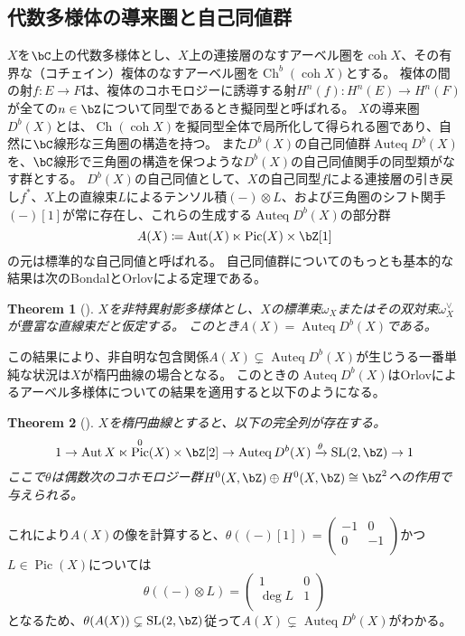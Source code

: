 \documentclass[uplatex,a4paper,dvipdfmx]{jsarticle}
\theoremstyle{plain}
\newtheorem{theorem}{Theorem}[section]
\theoremstyle{definition}
\DeclareMathOperator{\Auteq}{\mathrm{Auteq}}
\DeclareMathOperator{\Pic}{\mathrm{Pic}}
\DeclareMathOperator{\Aut}{\mathrm{Aut}}
\DeclareMathOperator{\SL}{\mathrm{SL}}
\DeclareMathOperator{\Ch}{\mathrm{Ch}}
\DeclareMathOperator{\coh}{\mathrm{coh}}
\begin{document}
\subsection{代数多様体の導来圏と自己同値群}
$X$を$\bC$上の代数多様体とし、$X$上の連接層のなすアーベル圏を$\coh X$、その有界な（コチェイン）複体のなすアーベル圏を$\Ch^b(\coh X)$とする。
複体の間の射$f \colon E \to F$は、複体のコホモロジーに誘導する射$H^n(f) \colon H^n(E) \to H^n(F)$が全ての$n \in \bZ$について同型であるとき擬同型と呼ばれる。
$X$の導来圏$D^b(X)$とは、$\Ch(\coh X)$を擬同型全体で局所化して得られる圏であり、自然に$\bC$線形な三角圏の構造を持つ。
また$D^b(X)$の自己同値群$\Auteq D^b(X)$を、$\bC$線形で三角圏の構造を保つような$D^b(X)$の自己同値関手の同型類がなす群とする。
$D^b(X)$の自己同値として、$X$の自己同型$f$による連接層の引き戻し$f^*$、$X$上の直線束$L$によるテンソル積$(-)\otimes L$、および三角圏のシフト関手$(-)[1]$が常に存在し、これらの生成する$\Auteq D^b(X)$の部分群
\begin{equation}
	A(X) \coloneq \Aut(X) \ltimes \Pic(X) \times \bZ[1]
\end{equation}
の元は標準的な自己同値と呼ばれる。
自己同値群についてのもっとも基本的な結果は次のBondalとOrlovによる定理である。
\begin{theorem}[\cite{MR1818984}]
	$X$を非特異射影多様体とし、$X$の標準束$\omega_X$またはその双対束$\omega_X^\vee$が豊富な直線束だと仮定する。
	このとき$A(X) = \Auteq D^b(X)$である。
\end{theorem}
この結果により、非自明な包含関係$A(X) \subsetneq \Auteq D^b(X)$が生じうる一番単純な状況は$X$が楕円曲線の場合となる。
このときの$\Auteq D^b(X)$はOrlovによるアーベル多様体についての結果を適用すると以下のようになる。
\begin{theorem}[\cite{MR1921811}]
	$X$を楕円曲線とすると、以下の完全列が存在する。
	\begin{equation}\label{eq:autoequivalence_of_elliptic_curve}
		1 \to \Aut{X} \ltimes \Pic^{0}(X)\times \bZ[2] \to \Auteq{D^b(X)} \xrightarrow{\theta} \SL(2, \bZ) \to 1
	\end{equation}
	ここで$\theta$は偶数次のコホモロジー群$H^0(X, \bZ) \oplus H^0(X, \bZ) \cong \bZ^2$への作用で与えられる。
\end{theorem}
これにより$A(X)$の像を計算すると、$\theta((-)[1]) = \begin{pmatrix}
		-1 & 0  \\
		0  & -1 \\
	\end{pmatrix}$かつ$L \in \Pic(X)$については
\begin{equation}
	\theta((-) \otimes L) =
	\begin{pmatrix}
		1      & 0 \\
		\deg L & 1 \\
	\end{pmatrix}
\end{equation}
となるため、$\theta(A(X)) \subsetneq \SL(2, \bZ)$従って$A(X) \subsetneq \Auteq D^b(X)$がわかる。
\end{document}
